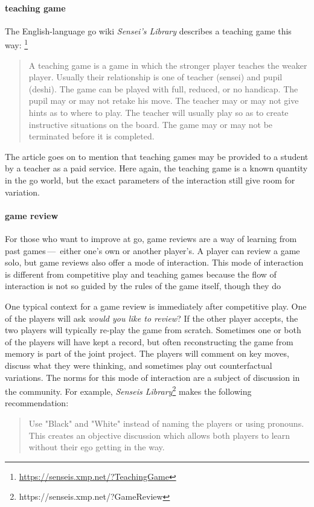 \documentclass{scrartcl}
\begin{document}
\paragraph{teaching game} The English-language go wiki 
\textit{Sensei's Library}
describes a teaching game this way:%
\footnote{\url{https://senseis.xmp.net/?TeachingGame}}
\begin{quote}
  A teaching game is a game in which the stronger player teaches the weaker player. Usually their relationship is one of teacher (sensei) and pupil (deshi). The game can be played with full, reduced, or no handicap. The pupil may or may not retake his move. The teacher may or may not give hints as to where to play. The teacher will usually play so as to create instructive situations on the board. The game may or may not be terminated before it is completed. 
\end{quote}

\noindent The article goes on to mention that teaching games may
be provided to a student by a teacher as a paid service.
Here again, the teaching game is a known quantity in the go world,
but the exact parameters of the interaction still 
give room for variation. 

\paragraph{game review} For those who want to improve at go,
game reviews are a way of learning from past games\,---\,%
either one's own or another player's.
A player can review a game solo, 
but game reviews also offer a mode of interaction.
This mode of interaction is different from competitive play and
teaching games because the flow of interaction is not so guided
by the rules of the game itself, though they do 

One typical context for a game review is immediately after 
competitive play. 
One of the players will ask \textit{would you like to review}?
If the other player accepts, 
the two players will typically re-play the game from scratch.
Sometimes one or both of the players will have kept a record,
but often reconstructing the game from memory is part of the 
joint project.
The players will comment on key moves, 
discuss what they were thinking,
and sometimes play out counterfactual variations.
The norms for this mode of interaction are
a subject of discussion in the community.
For example, \textit{Senseis Library}\footnote{https://senseis.xmp.net/?GameReview}
makes the following recommendation:
\begin{quote}
   Use "Black" and "White" instead of naming the players or using pronouns. This creates an objective discussion which allows both players to learn without their ego getting in the way. 
\end{quote}
\end{document}
